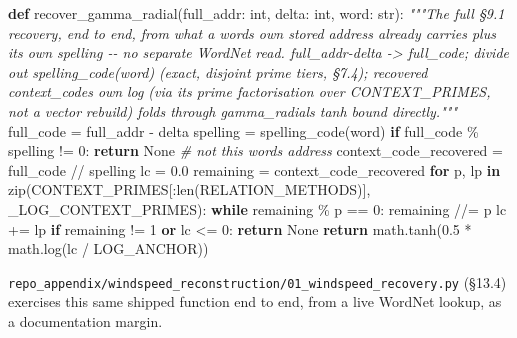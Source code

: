 \documentclass[
  10pt,
]{article}
\newenvironment{Shaded}{}{}
\newcommand{\BuiltInTok}[1]{\textcolor[rgb]{0.00,0.50,0.00}{#1}}
\newcommand{\CommentTok}[1]{\textcolor[rgb]{0.38,0.63,0.69}{\textit{#1}}}
\newcommand{\ControlFlowTok}[1]{\textcolor[rgb]{0.00,0.44,0.13}{\textbf{#1}}}
\newcommand{\DecValTok}[1]{\textcolor[rgb]{0.25,0.63,0.44}{#1}}
\newcommand{\FloatTok}[1]{\textcolor[rgb]{0.25,0.63,0.44}{#1}}
\newcommand{\KeywordTok}[1]{\textcolor[rgb]{0.00,0.44,0.13}{\textbf{#1}}}
\newcommand{\NormalTok}[1]{#1}
\newcommand{\OperatorTok}[1]{\textcolor[rgb]{0.40,0.40,0.40}{#1}}
\newcommand{\VariableTok}[1]{\textcolor[rgb]{0.10,0.09,0.49}{#1}}
\begin{document}
\begin{Shaded}
\begin{Highlighting}[]
\KeywordTok{def}\NormalTok{ recover\_gamma\_radial(full\_addr: }\BuiltInTok{int}\NormalTok{, delta: }\BuiltInTok{int}\NormalTok{, word: }\BuiltInTok{str}\NormalTok{):}
    \CommentTok{"""The full §9.1 recovery, end to end, from what a word\textquotesingle{}s own stored}
\CommentTok{    address already carries plus its own spelling {-}{-} no separate WordNet}
\CommentTok{    read. full\_addr{-}delta {-}\textgreater{} full\_code; divide out spelling\_code(word)}
\CommentTok{    (exact, disjoint prime tiers, §7.4); recovered context\_code\textquotesingle{}s own}
\CommentTok{    log (via its prime factorisation over CONTEXT\_PRIMES, not a vector}
\CommentTok{    rebuild) folds through gamma\_radial\textquotesingle{}s tanh bound directly."""}
\NormalTok{    full\_code }\OperatorTok{=}\NormalTok{ full\_addr }\OperatorTok{{-}}\NormalTok{ delta}
\NormalTok{    spelling }\OperatorTok{=}\NormalTok{ spelling\_code(word)}
    \ControlFlowTok{if}\NormalTok{ full\_code }\OperatorTok{\%}\NormalTok{ spelling }\OperatorTok{!=} \DecValTok{0}\NormalTok{:}
        \ControlFlowTok{return} \VariableTok{None}                     \CommentTok{\# not this word\textquotesingle{}s address}
\NormalTok{    context\_code\_recovered }\OperatorTok{=}\NormalTok{ full\_code }\OperatorTok{//}\NormalTok{ spelling}
\NormalTok{    lc }\OperatorTok{=} \FloatTok{0.0}
\NormalTok{    remaining }\OperatorTok{=}\NormalTok{ context\_code\_recovered}
    \ControlFlowTok{for}\NormalTok{ p, lp }\KeywordTok{in} \BuiltInTok{zip}\NormalTok{(CONTEXT\_PRIMES[:}\BuiltInTok{len}\NormalTok{(RELATION\_METHODS)], \_LOG\_CONTEXT\_PRIMES):}
        \ControlFlowTok{while}\NormalTok{ remaining }\OperatorTok{\%}\NormalTok{ p }\OperatorTok{==} \DecValTok{0}\NormalTok{:}
\NormalTok{            remaining }\OperatorTok{//=}\NormalTok{ p}
\NormalTok{            lc }\OperatorTok{+=}\NormalTok{ lp}
    \ControlFlowTok{if}\NormalTok{ remaining }\OperatorTok{!=} \DecValTok{1} \KeywordTok{or}\NormalTok{ lc }\OperatorTok{\textless{}=} \DecValTok{0}\NormalTok{:}
        \ControlFlowTok{return} \VariableTok{None}
    \ControlFlowTok{return}\NormalTok{ math.tanh(}\FloatTok{0.5} \OperatorTok{*}\NormalTok{ math.log(lc }\OperatorTok{/}\NormalTok{ LOG\_ANCHOR))}
\end{Highlighting}
\end{Shaded}

\texttt{repo\_appendix/windspeed\_reconstruction/01\_windspeed\_recovery.py}
(§13.4) exercises this same shipped function end to end, from a live
WordNet lookup, as a documentation margin.
\end{document}
